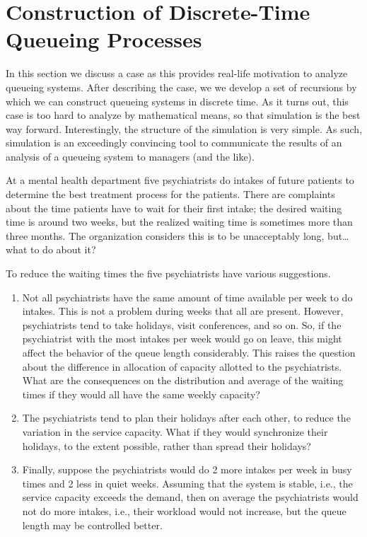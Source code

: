 \section{Construction of Discrete-Time Queueing
  Processes}
\label{sec:constr-discr-time}

In this section we discuss a case as this provides real-life
motivation to analyze queueing systems. After describing the case, we
we develop a set of recursions by which we can construct queueing
systems in discrete time.  As it turns out, this case is too hard to
analyze by mathematical means, so that simulation is the best way
forward. Interestingly, the structure of the simulation is very
simple. As such, simulation is an exceedingly convincing tool to
communicate the results of an analysis of a queueing system to
managers (and the like). 

At a mental health department five psychiatrists do intakes of future
patients to determine the best treatment process for the patients.
There are complaints about the time patients have to wait for their
first intake; the desired waiting time is around two weeks, but the
realized waiting time is sometimes more than three months. The
organization considers this is to be unacceptably long, but\ldots what to do about it?

To reduce the waiting times the five psychiatrists have various
suggestions. 
\begin{enumerate}
\item Not all psychiatrists have the same amount of time available per
  week to do intakes. This is not a problem during weeks that all are
  present. However, psychiatrists tend to take holidays, visit
  conferences, and so on. So, if the psychiatrist with the most
  intakes per week would go on leave, this might affect the behavior
  of the queue length considerably. This raises the question about the difference
  in allocation of capacity allotted to the psychiatrists. What are
  the consequences on the distribution and average of the waiting
  times if they would all have the same weekly capacity?
\item The psychiatrists tend to plan their holidays after each
  other, to reduce the variation in the service capacity. What if they
  would synchronize their holidays, to the extent possible, rather
  than spread their holidays? 
\item Finally, suppose the psychiatrists would do 2 more intakes per
  week in busy times and 2 less in quiet weeks. Assuming that the
  system is stable, i.e., the service capacity exceeds the demand,
  then on average the psychiatrists would not do more intakes, i.e.,
  their workload would not increase, but the queue length may be
  controlled better.
\end{enumerate}


